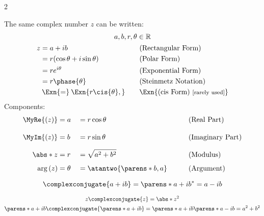 \begin{multicols}{2}
\begin{CheatsheetEntryFrame}
        The same complex number $z$ can be written:
        \begin{gather*}
            a, b, r, \theta \in \mathbb{R}
            \\
            \begin{alignedat}{2}
                z
                    &= a + ib &
                        \qquad & \text{(Rectangular Form)} \\
                    &= r(\cos{\theta} + i \sin{\theta}) &
                        \qquad & \text{(Polar Form)} \\
                    &= r e^{i \theta} &
                        \qquad & \text{(Exponential Form)} \\
                    &= r \phase{\theta} &
                        \qquad & \text{(Steinmetz Notation)} \\
                    &\mathbin{\Exn{=}} \Exn{r \cis{\theta},} &
                        \qquad & \Exn{\text{(cis Form) \footnotesize [rarely used]}}
            \end{alignedat}%
        \end{gather*}
        Components:
        \begin{alignat*}{3}
            \MyRe{(z)}  &= a      &&= r \cos{\theta} \phantom{\frac{}{a}} &
                \qquad & \text{(Real Part)} \\
            \MyIm{(z)}  &= b      &&= r \sin{\theta} \phantom{\frac{b}{a}} &
                \qquad & \text{(Imaginary Part)} \\
            \abs*{z}    &= r      &&= \sqrt{a^2 + b^2} \phantom{\frac{b}{a}} &
                \qquad & \text{(Modulus)} \\
            \arg{(z)}   &= \theta &&= \atantwo{\parens*{b, a}} &
                \qquad & \text{(Argument)}
        \end{alignat*}

    \end{CheatsheetEntryFrame}

    \begin{CheatsheetEntryFrame}

        \begin{equation*}
            \complexconjugate{a + ib}
            = \parens*{a + ib}^*
            = a - ib
        \end{equation*}

        \begin{gather*}
            z \complexconjugate{z} = \abs*{z}^2 \\
            \parens*{a + ib} \complexconjugate{\parens*{a + ib}} = \parens*{a + ib} \parens*{a - ib} = a^2 + b^2
        \end{gather*}
        
    \end{CheatsheetEntryFrame}

    \MulticolsBreak

    \MulticolsPhantomPlaceholder

\end{multicols}

